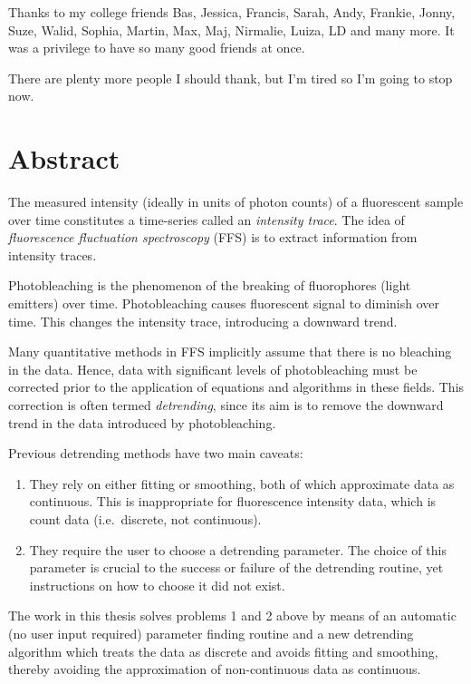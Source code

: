 \documentclass[12pt,]{book}
\providecommand{\tightlist}{%
  \setlength{\itemsep}{0pt}\setlength{\parskip}{0pt}}
\theoremstyle{definition}
\theoremstyle{definition}
\theoremstyle{definition}
\theoremstyle{remark}
\begin{document}
Thanks to my college friends Bas, Jessica, Francis, Sarah, Andy,
Frankie, Jonny, Suze, Walid, Sophia, Martin, Max, Maj, Nirmalie, Luiza,
LD and many more. It was a privilege to have so many good friends at
once.

There are plenty more people I should thank, but I'm tired so I'm going
to stop now.

\chapter*{Abstract}\label{abstract}

The measured intensity (ideally in units of photon counts) of a
fluorescent sample over time constitutes a time-series called an
\emph{intensity trace}. The idea of \emph{fluorescence fluctuation
spectroscopy} (FFS) is to extract information from intensity traces.

Photobleaching is the phenomenon of the breaking of fluorophores (light
emitters) over time. Photobleaching causes fluorescent signal to
diminish over time. This changes the intensity trace, introducing a
downward trend.

Many quantitative methods in FFS implicitly assume that there is no
bleaching in the data. Hence, data with significant levels of
photobleaching must be corrected prior to the application of equations
and algorithms in these fields. This correction is often termed
\emph{detrending}, since its aim is to remove the downward trend in the
data introduced by photobleaching.

Previous detrending methods have two main caveats:

\begin{enumerate}
\def\labelenumi{\arabic{enumi}.}
\tightlist
\item
  They rely on either fitting or smoothing, both of which approximate
  data as continuous. This is inappropriate for fluorescence intensity
  data, which is count data (i.e.~discrete, not continuous).
\item
  They require the user to choose a detrending parameter. The choice of
  this parameter is crucial to the success or failure of the detrending
  routine, yet instructions on how to choose it did not exist.
\end{enumerate}

The work in this thesis solves problems 1 and 2 above by means of an
automatic (no user input required) parameter finding routine and a new
detrending algorithm which treats the data as discrete and avoids
fitting and smoothing, thereby avoiding the approximation of
non-continuous data as continuous.
\end{document}

